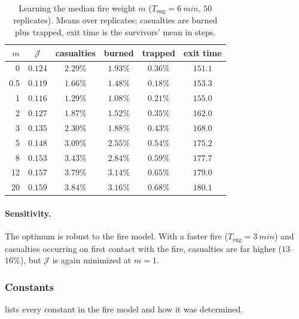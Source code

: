 \begin{table}[H]
  \centering
  \caption{Learning the median fire weight $m$ ($T_{\text{eng}} = \SI{6}{min}$, $50$
  replicates). Means over replicates; casualties are burned plus trapped, exit time is the
  survivors' mean in steps.}
  \label{tab:kF}
  \begin{tabular}{rccccc}
    \toprule
    $m$ & $\mathcal{J}$ & casualties & burned & trapped & exit time \\
    \midrule
    0    & $0.124$ & $2.29\%$ & $1.93\%$ & $0.36\%$ & $151.1$ \\
    0.5  & $0.119$ & $1.66\%$ & $1.48\%$ & $0.18\%$ & $153.3$ \\
    1    & $0.116$ & $1.29\%$ & $1.08\%$ & $0.21\%$ & $155.0$ \\
    2    & $0.127$ & $1.87\%$ & $1.52\%$ & $0.35\%$ & $162.0$ \\
    3    & $0.135$ & $2.30\%$ & $1.88\%$ & $0.43\%$ & $168.0$ \\
    5    & $0.148$ & $3.09\%$ & $2.55\%$ & $0.54\%$ & $175.2$ \\
    8    & $0.153$ & $3.43\%$ & $2.84\%$ & $0.59\%$ & $177.7$ \\
    12   & $0.157$ & $3.79\%$ & $3.14\%$ & $0.65\%$ & $179.0$ \\
    20   & $0.159$ & $3.84\%$ & $3.16\%$ & $0.68\%$ & $180.1$ \\
    \bottomrule
  \end{tabular}
\end{table}

\paragraph{Sensitivity.} The optimum is robust to the fire model. With a faster fire
($T_{\text{eng}} = \SI{3}{min}$) and casualties occurring on first contact with the fire,
casualties are far higher ($13$--$16\%$), but $\mathcal{J}$ is again minimized at $m = 1$.

\subsubsection{Constants}\label{sec:fire_constants}

 lists every constant in the fire model and how it was determined.

